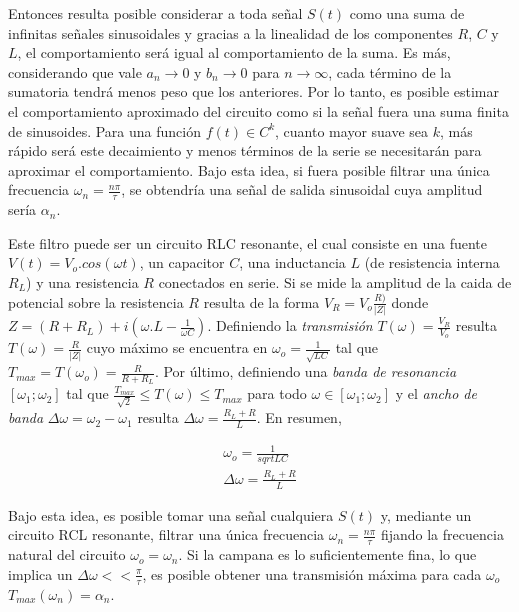 \documentclass[11pt,a4paper]{article}
\begin{document}
Entonces resulta posible considerar a toda señal $S(t)$ como una suma de infinitas señales sinusoidales y gracias a la linealidad de los componentes $R$, $C$ y $L$, el comportamiento será igual al comportamiento de la suma. Es más, considerando que vale $a_n \rightarrow 0$ y $b_n \rightarrow 0$ para $n \rightarrow \infty$, cada término de la sumatoria tendrá menos peso que los anteriores. Por lo tanto, es posible estimar el comportamiento aproximado del circuito como si la señal fuera una suma finita de sinusoides. Para una función $f(t)\in C^k$, cuanto mayor suave sea $k$, más rápido será este decaimiento y menos términos de la serie se necesitarán para aproximar el comportamiento. Bajo esta idea, si fuera posible filtrar una única frecuencia $\omega_n = \frac{n\pi}{\tau}$, se obtendría una señal de salida sinusoidal cuya amplitud sería $\alpha_n$. 

Este filtro puede ser un circuito RLC resonante, el cual consiste en una fuente $V(t) = V_o.cos(\omega t)$, un capacitor $C$, una inductancia $L$ (de resistencia interna $R_L$) y una resistencia $R$ conectados en serie. Si se mide la amplitud de la caida de potencial sobre la resistencia $R$ resulta de la forma $V_R = V_o\frac{R)}{|Z|}$ donde $Z = (R+R_L)+i(\omega.L-\frac{1}{\omega C})$. Definiendo la \textit{transmisión} $T(\omega) = \frac{V_R}{V_o}$ resulta $T(\omega) = \frac{R}{|Z|}$ cuyo máximo se encuentra en $\omega_o = \frac{1}{\sqrt{LC}}$ tal que $T_{max} = T(\omega_o) = \frac{R}{R+R_L}$. Por último, definiendo una \textit{banda de resonancia} $[\omega_1;\omega_2]$ tal que $\frac{T_{max}}{\sqrt{2}} \leq T(\omega) \leq T_{max}$ para todo $\omega \in [\omega_1;\omega_2]$ y el \textit{ancho de banda} $\Delta\omega = \omega_2 - \omega_1$ resulta $\Delta\omega = \frac{R_L+R}{L}$. En resumen,

\begin{equation}
\begin{split}
\omega_o = \frac{1}{sqrt{LC}}\\
\Delta\omega = \frac{R_L+R}{L}
\end{split}
\label{eq:resonante}
\end{equation}

Bajo esta idea, es posible tomar una señal cualquiera $S(t)$ y, mediante un circuito RCL resonante, filtrar una única frecuencia $\omega_n = \frac{n\pi}{\tau}$ fijando la frecuencia natural del circuito $\omega_o = \omega_n$. Si la campana es lo suficientemente fina, lo que implica un $\Delta \omega << \frac{\pi}{\tau}$, es posible obtener una transmisión máxima para cada $\omega_o$ $T_{max}(\omega_n) = \alpha_n$.
\end{document}

